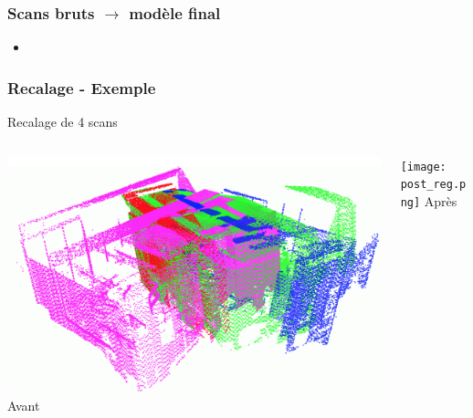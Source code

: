 \documentclass{beamer}
\begin{document}
\begin{frame}
\frametitle{Scans bruts $\rightarrow$ modèle final}
	\begin{itemize}
	\item 
	\end{itemize}
\end{frame}

\begin{frame}
\frametitle{Recalage - Exemple}
	\center Recalage de 4 scans \footnotesize{\cite{Maka2006}}
	\vspace{1cm}
	\begin{columns}
	\begin{column}[T]{.5\textwidth}
		\includegraphics[width=\textwidth]{pre_reg.png}
		\center \Large{Avant}
	
	\end{column}
	\begin{column}[T]{.5\textwidth}
		\texttt{[image: post\_reg.png]}
		\center \Large{Après}
	\end{column}
	\end{columns}
\end{frame}



\end{document}
